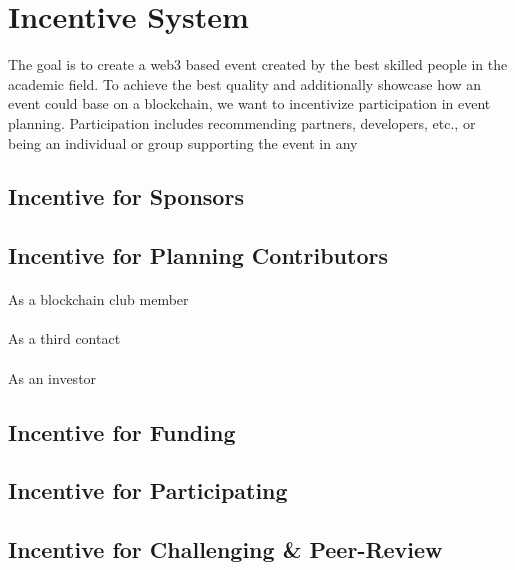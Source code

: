 \section{Incentive System}
\label{sec:Incentive System}
The goal is to create a web3 based event created by the best skilled people in the academic field. To achieve the best quality and additionally showcase how an event could base on a blockchain, we want to incentivize participation in event planning. Participation includes recommending partners, developers, etc., or being an individual or group supporting the event in any 

\subsection{Incentive for Sponsors}
\label{subsec:Incentive_sponsors}

\subsection{Incentive for Planning Contributors}

\paragraph{}{As a blockchain club member}

\paragraph{}{As a third contact}

\paragraph{}{As an investor}

\subsection{Incentive for Funding}

\subsection{Incentive for Participating}

\subsection{Incentive for Challenging \& Peer-Review}